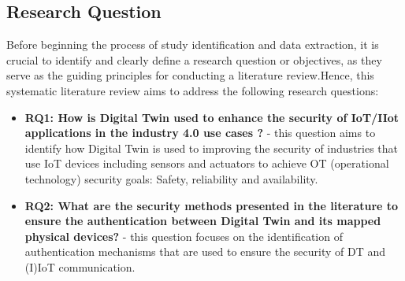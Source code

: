 
\subsection{Research Question}
Before beginning the process of study identification and data extraction, it is crucial to identify and clearly define a research question or objectives, as they serve as the guiding principles for conducting a literature review\cite{carrera-rivera_how-conduct_2022}.Hence, this systematic literature review aims to address the following research questions:

\begin{itemize}

    \item \textbf{RQ1: How is Digital Twin used to enhance the security of IoT/IIot applications in the industry 4.0 use cases ?} - 
    this question aims to identify how Digital Twin is used to improving the security of industries that use IoT devices including sensors and actuators to achieve OT (operational technology) security goals: Safety, reliability and availability.

    \item \textbf{RQ2: What are the security methods presented in the literature to ensure the authentication between Digital Twin and its mapped physical devices?} - 
    this question focuses on the identification of authentication mechanisms that are used to ensure the security of DT and (I)IoT communication.
\end{itemize}